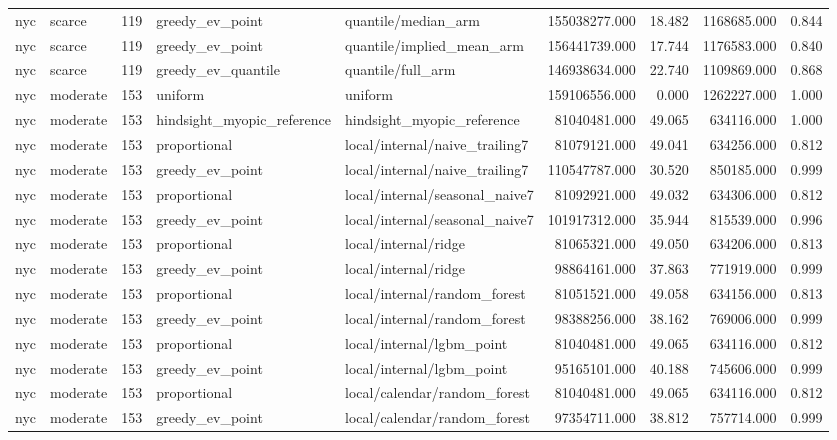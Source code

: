 \begin{tabular}{llrllrrrr}
nyc & scarce & 119 & greedy\_ev\_point & quantile/median\_arm & 155038277.000 & 18.482 & 1168685.000 & 0.844 \\
nyc & scarce & 119 & greedy\_ev\_point & quantile/implied\_mean\_arm & 156441739.000 & 17.744 & 1176583.000 & 0.840 \\
nyc & scarce & 119 & greedy\_ev\_quantile & quantile/full\_arm & 146938634.000 & 22.740 & 1109869.000 & 0.868 \\
nyc & moderate & 153 & uniform & uniform & 159106556.000 & 0.000 & 1262227.000 & 1.000 \\
nyc & moderate & 153 & hindsight\_myopic\_reference & hindsight\_myopic\_reference & 81040481.000 & 49.065 & 634116.000 & 1.000 \\
nyc & moderate & 153 & proportional & local/internal/naive\_trailing7 & 81079121.000 & 49.041 & 634256.000 & 0.812 \\
nyc & moderate & 153 & greedy\_ev\_point & local/internal/naive\_trailing7 & 110547787.000 & 30.520 & 850185.000 & 0.999 \\
nyc & moderate & 153 & proportional & local/internal/seasonal\_naive7 & 81092921.000 & 49.032 & 634306.000 & 0.812 \\
nyc & moderate & 153 & greedy\_ev\_point & local/internal/seasonal\_naive7 & 101917312.000 & 35.944 & 815539.000 & 0.996 \\
nyc & moderate & 153 & proportional & local/internal/ridge & 81065321.000 & 49.050 & 634206.000 & 0.813 \\
nyc & moderate & 153 & greedy\_ev\_point & local/internal/ridge & 98864161.000 & 37.863 & 771919.000 & 0.999 \\
nyc & moderate & 153 & proportional & local/internal/random\_forest & 81051521.000 & 49.058 & 634156.000 & 0.813 \\
nyc & moderate & 153 & greedy\_ev\_point & local/internal/random\_forest & 98388256.000 & 38.162 & 769006.000 & 0.999 \\
nyc & moderate & 153 & proportional & local/internal/lgbm\_point & 81040481.000 & 49.065 & 634116.000 & 0.812 \\
nyc & moderate & 153 & greedy\_ev\_point & local/internal/lgbm\_point & 95165101.000 & 40.188 & 745606.000 & 0.999 \\
nyc & moderate & 153 & proportional & local/calendar/random\_forest & 81040481.000 & 49.065 & 634116.000 & 0.812 \\
nyc & moderate & 153 & greedy\_ev\_point & local/calendar/random\_forest & 97354711.000 & 38.812 & 757714.000 & 0.999 \\

\end{tabular}
